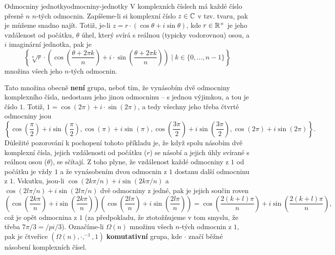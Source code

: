 \begin{example}{Odmocniny jednotky}{odmocniny-jednotky}
 V komplexních číslech má každé číslo přesně $n$ $n$-tých odmocnin. Zapíšeme-li
 si komplexní číslo $z \in \mathbb{C}$ v tzv.  tvaru, pak je můžeme
 snadno najít. Totiž, je-li $z = r \cdot (\cos\theta + i \sin\theta)$, kde $r
 \in \mathbb{R}^{+}$ je jeho vzdálenost od počátku, $\theta$ úhel, který svírá s reálnou
 (typicky vodorovnou) osou, a $i$ imaginární jednotka, pak je
 \[
  \left\{\sqrt[n]{r} \cdot \left(\cos\left(\frac{\theta + 2\pi k}{n}\right) + i
  \cdot \sin\left(\frac{\theta + 2\pi k}{n}\right)\right) \mid k \in
  \{0,\ldots,n-1\} \right\}
 \]
 množina všech jeho $n$-tých odmocnin.

 Tato množina obecně \textbf{není} grupa, neboť tím, že vynásobím dvě odmocniny
 komplexního čísla, nedostanu jeho jinou odmocninu -- s jednou výjimkou, a tou
 je číslo $1$. Totiž, $1 = \cos(2\pi) + i \cdot \sin(2\pi)$, a tedy všechny jeho
 třeba čtvrté odmocniny jsou
 \[
  \left\{ \cos\left(\frac{\pi}{2}\right)+i \sin \left( \frac{\pi}{2} \right),
  \cos \left( \pi \right) + i \sin \left( \pi \right),
  \cos\left(\frac{3\pi}{2}\right)+i\sin \left( \frac{3\pi}{2} \right), \cos
  \left( 2\pi \right) + i\sin \left( 2\pi \right) \right\}.
 \]
 Důležité pozorování k pochopení tohoto příkladu je, že když spolu násobím dvě
 komplexní čísla, jejich vzdálenosti od počátku ($r$) se násobí a jejich úhly
 svírané s reálnou osou ($\theta$), se sčítají. Z toho plyne, že vzdálenost
 každé odmocniny z $1$ od počátku je vždy $1$ a že vynásobením dvou odmocnin z
 $1$ dostanu další odmocninu z $1$. Vskutku, jsou-li $\cos (2k\pi / n) +
 i\sin(2k\pi / n)$ a $\cos(2l\pi / n) + i\sin(2l\pi / n)$ dvě odmocniny z jedné,
 pak je jejich součin roven
 \[
  \left( \cos \left( \frac{2k\pi}{n} \right) + i\sin \left( \frac{2k\pi}{n}
   \right) \right) \left( \cos \left( \frac{2l\pi}{n} \right) + i\sin \left(
   \frac{2l\pi}{n} \right)\right) = \cos \left( \frac{2(k+l)\pi}{n} \right) +
   i\sin \left( \frac{2(k+l)\pi}{n} \right),
 \]
 což je opět odmocnina z $1$ (za předpokladu, že ztotožňujeme  v tom smyslu, že třeba $7\pi / 3 = /pi / 3$). Označíme-li $\Omega(n)$
 množinu všech $n$-tých odmocnin z $1$, pak je čtveřice $(\Omega(n), \cdot
 ,^{-1},1)$ \textbf{komutativní} grupa, kde $ \cdot $ značí běžné násobení
 komplexních čísel.
 \begin{figure}[H]
  \centering
  \begin{subfigure}[t]{.3\textwidth}
   \centering
\end{subfigure}
\end{figure}
\end{example}
